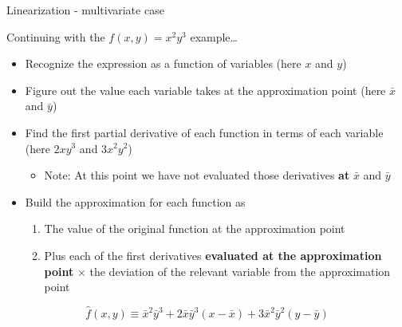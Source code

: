 \begin{frame}{Linearization - multivariate case}

Continuing with the $f(x,y) = x^{2} y^{3}$ example\ldots

\begin{itemize}
\item	Recognize the expression as a function of variables (here $x$ and $y$)
\item	Figure out the value each variable takes at the approximation point (here $\bar{x}$ and $\bar{y}$)
\item	Find the first partial derivative of each function in terms of each variable (here $2xy^{3}$ and $3x^{2}y^{2}$)
	\begin{itemize}
	\item	Note: At this point we have not evaluated those derivatives \textbf{at} $\bar{x}$ and $\bar{y}$
	\end{itemize}
\item	Build the approximation for each function as
	\begin{enumerate}
	\item	The value of the original function at the approximation point
	\item	Plus each of the first derivatives \textbf{evaluated at the approximation point} $\times$ the deviation of the relevant variable from the approximation point
	\end{enumerate}
\end{itemize}
\[
 \hat{f}(x,y) \equiv \bar{x}^{2} \bar{y}^{3} +  2\bar{x}\bar{y}^{3}(x-\bar{x}) + 3\bar{x}^{2}\bar{y}^{2}(y-\bar{y})
\]
\end{frame}



